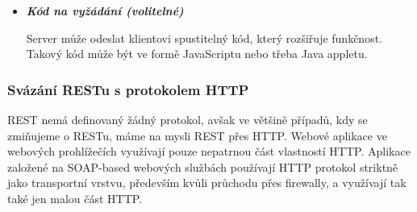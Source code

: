 \documentclass[11pt,twoside,a4paper]{book}
\begin{document}
\begin{itemize}
	\begin{itemize}
 	 \item \textit{HATEOAS (hypermedia as the engine of application state)} –
 	 klienti mohou přejít dynamicky do jiného stavu v aplikaci přes hypermedia
 	 poslané serverem v předchozí odpovědi. Jinými slovy, odpověď od serveru
 	 obsahuje hyperlinky\footnote{Adresa zdroje, na který je možno přejít}, na
 	 které může klient přejít, aby se dostal do jiného stavu v aplikaci.
	  \item \textit{Adresovatelné zdroje} – každý zdroj
	  poskytující informace a data musí být jednoznačně identifikovaný svou
	  URI\footnote{Textový řetězec s definovanou strukturou sloužící pro přesnou
	  specifikaci zdroje informací}.
		\item \textit{Manipulace se zdrojem a jejich reprezentacemi} – pokud se klient
		nachází na určitém zdroji, může s ním provádět operace modifikace či smazání.
		\item \textit{Orientace na reprezentaci} – u jedné
		URI lze nastavit, aby dokázala použít odlišné formáty dat, protože ne všechny platformy užívají stejný formát. Například webový
prohlížeč používá HTML a JavaScript, který potřebuje JSON. Java aplikace může
vyžadovat XML.
\end{itemize}

\item\textbf{\textit{Kód na vyžádání (volitelné)}}

Server může odeslat klientovi spustitelný kód, který rozšiřuje funkčnost.
Takový kód může být ve formě JavaScriptu nebo třeba Java appletu.
\end{itemize}

\subsubsection{Svázání RESTu s protokolem HTTP}

REST nemá definovaný žádný protokol, avšak ve většině případů, kdy se zmiňujeme o
RESTu, máme na mysli REST přes HTTP. Webové aplikace ve webových prohlížečích 
využívají pouze nepatrnou část vlastností HTTP. Aplikace založené na SOAP-based
webových službách používají HTTP protokol striktně jako transportní vrstvu,
především kvůli průchodu přes firewally, a využívají tak také jen malou část
HTTP.
\end{document}
